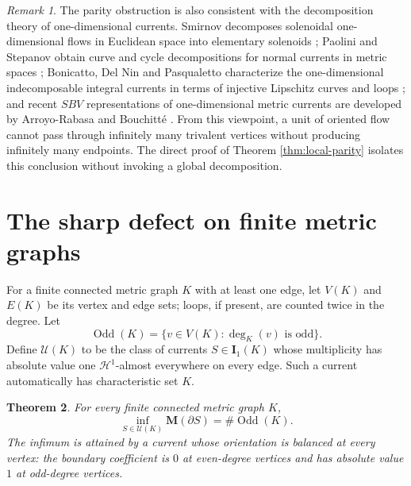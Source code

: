 \documentclass[11pt]{article}
\newtheorem{theorem}{Theorem}[section]
\theoremstyle{remark}
\newtheorem{remark}[theorem]{Remark}
\newcommand{\M}{\mathbf M}
\newcommand{\I}{\mathbf I}
\newcommand{\Hh}{\mathcal H}
\newcommand{\Odd}{\operatorname{Odd}}
\begin{document}
\begin{remark}\label{rem:decomposition}
The parity obstruction is also consistent with the decomposition theory of one-dimensional currents. Smirnov decomposes solenoidal one-dimensional flows in Euclidean space into elementary solenoids \cite{Smirnov94}; Paolini and Stepanov obtain curve and cycle decompositions for normal currents in metric spaces \cite{PaoliniStepanov12,PaoliniStepanov13}; Bonicatto, Del Nin and Pasqualetto characterize the one-dimensional indecomposable integral currents in terms of injective Lipschitz curves and loops \cite{BDP22}; and recent $SBV$ representations of one-dimensional metric currents are developed by Arroyo-Rabasa and Bouchitt\'e \cite{ArroyoRabasaBouchitte25}. From this viewpoint, a unit of oriented flow cannot pass through infinitely many trivalent vertices without producing infinitely many endpoints. The direct proof of Theorem \ref{thm:local-parity} isolates this conclusion without invoking a global decomposition.
\end{remark}

\section{The sharp defect on finite metric graphs}\label{sec:finite}

For a finite connected metric graph $K$ with at least one edge, let $V(K)$ and $E(K)$ be its vertex and edge sets; loops, if present, are counted twice in the degree. Let
\[
   \Odd(K)=\{v\in V(K):\deg_K(v)\text{ is odd}\}.
\]
Define $\mathscr U(K)$ to be the class of currents $S\in\I_1(K)$ whose multiplicity has absolute value one $\Hh^1$-almost everywhere on every edge. Such a current automatically has characteristic set $K$.

\begin{theorem}\label{thm:finite-defect}
For every finite connected metric graph $K$,
\[
   \inf_{S\in\mathscr U(K)}\M(\partial S)
   =\#\Odd(K).
\]
The infimum is attained by a current whose orientation is balanced at every vertex: the boundary coefficient is $0$ at even-degree vertices and has absolute value $1$ at odd-degree vertices.
\end{theorem}
\end{document}
